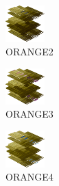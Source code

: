 \hspace{0.1cm}
\begin{minipage}[b]{0.15\linewidth}
\begin{figure}[H]                                                          
  \centering                                                             
  \begin{adjustbox}{width=1.5cm,center}                                   
  \includegraphics[width=1.5cm]{src/colorspace_colourflow/flows/colourflow_242-45.png}%
  \end{adjustbox}                                                        
\caption*{ORANGE2}                                           
\end{figure}                                                               
\end{minipage}
\hspace{0.1cm}
\begin{minipage}[b]{0.15\linewidth}
\begin{figure}[H]                                                          
  \centering                                                             
  \begin{adjustbox}{width=1.5cm,center}                                   
  \includegraphics[width=1.5cm]{src/colorspace_colourflow/flows/colourflow_243-45.png}%
  \end{adjustbox}                                                        
\caption*{ORANGE3}                                           
\end{figure}                                                               
\end{minipage}
\hspace{0.1cm}
\begin{minipage}[b]{0.15\linewidth}
\begin{figure}[H]                                                          
  \centering                                                             
  \begin{adjustbox}{width=1.5cm,center}                                   
  \includegraphics[width=1.5cm]{src/colorspace_colourflow/flows/colourflow_244-45.png}%
  \end{adjustbox}                                                        
\caption*{ORANGE4}                                           
\end{figure}                                                               
\end{minipage}
